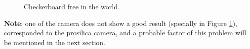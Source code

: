 \begin{figure}[!htbp]
 \centering
 \caption{Checkerboard free in the world.}
 \label{fig:cal_free}
\end{figure}

\textbf{Note}: one of the camera does not show a good result (specially in Figure \ref{fig:cal_free}), corresponded to the prosilica camera, and a probable factor of this problem will be mentioned in the next section.


